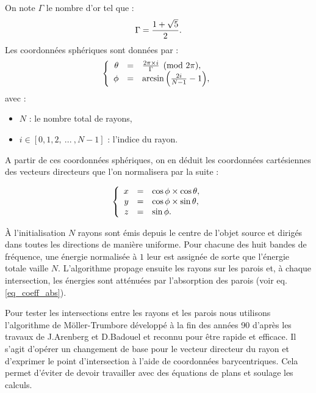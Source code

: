 On note $\Gamma$ le nombre d'or tel que :
\begin{equation*}
\Gamma = \frac{1 + \sqrt{5}}{2}. \\
\end{equation*}
%
Les coordonnées sphériques sont données par :
\begin{equation}
  \left \{
   \begin{array}{r c l}
\theta &=& \frac{2 \pi \times i}{\Gamma}  \pmod{2\pi},  \\
\phi &=& \arcsin{\left(\frac{2i}{N-1}-1\right)}, 
   \end{array}
   \right .
\end{equation}
%
avec : 
\begin{itemize}
\item $N$ : le nombre total de rayons,
\item $i \in[0, 1, 2, \ ... \ ,N-1]$ : l'indice du rayon.
\end{itemize}
%
A partir de ces coordonnées sphériques, on en déduit les coordonnées cartésiennes des vecteurs directeurs que l'on normalisera par la suite :

\begin{equation}
   \left \{
   \begin{array}{r c l}
x &=& \cos{\phi} \times \cos{\theta},  \\
y &=& \cos{\phi} \times \sin{\theta},  \\
z &=& \sin{\phi}.
   \end{array}
   \right .
\end{equation}


À l'initialisation $N$ rayons sont émis depuis le centre de l'objet source et dirigés dans toutes les directions de manière uniforme. Pour chacune des huit bandes de fréquence, une énergie normalisée à $1$ leur est assignée de sorte que l'énergie totale vaille $N$. L'algorithme propage ensuite les rayons sur les parois et, à chaque intersection, les énergies sont atténuées par l'absorption des parois (voir eq. \ref{eq_coeff_abs}). %

Pour tester les intersections entre les rayons et les parois nous utilisons l'algorithme de Möller-Trumbore \cite[p. 2-3]{moller} développé à la fin des années 90 d'après les travaux de J.Arenberg \cite{arenberg} et D.Badouel \cite[p. 390-393]{badouel} et reconnu pour être rapide et efficace. Il s'agit d'opérer un changement de base pour le vecteur directeur du rayon et d'exprimer le point d'intersection à l'aide de coordonnées barycentriques. Cela permet d'éviter de devoir travailler avec des équations de plans et soulage les calculs.

